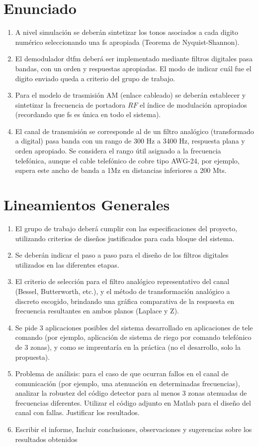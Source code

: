 \section{Enunciado}
\begin{enumerate}[label=\alph*)]
  \item A nivel simulación se deberán sintetizar los tonos asociados a cada digito numérico seleccionando una \gls{fs} apropiada (Teorema de Nyquist-Shannon).
  \item El demodulador \gls{dtfm} deberá ser implementado mediante filtros digitales pasa bandas, con un orden y respuestas apropiadas. El modo de indicar cuál fue el digito enviado queda a criterio del grupo de trabajo.
  \item Para el modelo de trasmisión AM (enlace cableado) se deberán establecer y sintetizar la frecuencia de portadora $RF$ el índice de modulación apropiados (recordando que \gls{fs} es única en todo el sistema).
  \item El canal de transmisión se corresponde al de un filtro analógico (transformado a digital) pasa banda con un rango de 300 Hz a 3400 Hz, respuesta plana y orden apropiado. Se considera el rango útil asignado a la frecuencia telefónica, aunque el cable         telefónico de cobre tipo AWG-24, por ejemplo, supera este ancho de banda a 1Mz en distancias inferiores a 200 Mts.
\end{enumerate}

\section{Lineamientos Generales}
\begin{enumerate}[label=\alph*)]
  \item El grupo de trabajo deberá cumplir con las especificaciones del proyecto, utilizando criterios de diseños justificados para cada bloque del sistema.
  \item Se deberán indicar el paso a paso para el diseño de los filtros digitales utilizados en las diferentes etapas.
  \item El criterio de selección para el filtro analógico representativo del canal (Bessel, Butterworth, etc.), y el método de transformación analógico a discreto escogido, brindando una gráfica comparativa de la respuesta en frecuencia resultantes en ambos planos (Laplace y Z).
  \item Se pide 3 aplicaciones posibles del sistema desarrollado en aplicaciones de tele comando (por ejemplo, aplicación de sistema de riego por comando telefónico de 3 zonas), y como se imprentaría en la práctica (no el desarrollo, solo la propuesta).
  \item Problema de análisis: para el caso de que ocurran fallos en el canal de comunicación (por ejemplo, una atenuación en determinadas frecuencias), analizar la robustez del código detector para al menos 3 zonas atenuadas de frecuencias diferentes. Utilizar el código adjunto en Matlab para el diseño del canal con fallas. Justificar los resultados.
  \item Escribir el informe, Incluir conclusiones, observaciones y sugerencias sobre los resultados obtenidos
\end{enumerate}